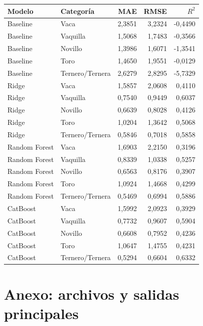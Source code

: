 \documentclass[11pt,a4paper]{article}
\begin{document}
\small
\begin{longtable}{llrrr}
\toprule
\textbf{Modelo} & \textbf{Categoría} & \textbf{MAE} & \textbf{RMSE} & \textbf{$R^2$}\\
\midrule
\endhead
Baseline & Vaca & 2,3851 & 3,2324 & -0,4490\\
Baseline & Vaquilla & 1,5068 & 1,7483 & -0,3566\\
Baseline & Novillo & 1,3986 & 1,6071 & -1,3541\\
Baseline & Toro & 1,4650 & 1,9551 & -0,0129\\
Baseline & Ternero/Ternera & 2,6279 & 2,8295 & -5,7329\\
Ridge & Vaca & 1,5857 & 2,0608 & 0,4110\\
Ridge & Vaquilla & 0,7540 & 0,9449 & 0,6037\\
Ridge & Novillo & 0,6639 & 0,8028 & 0,4126\\
Ridge & Toro & 1,0204 & 1,3642 & 0,5068\\
Ridge & Ternero/Ternera & 0,5846 & 0,7018 & 0,5858\\
Random Forest & Vaca & 1,6903 & 2,2150 & 0,3196\\
Random Forest & Vaquilla & 0,8339 & 1,0338 & 0,5257\\
Random Forest & Novillo & 0,6563 & 0,8176 & 0,3907\\
Random Forest & Toro & 1,0924 & 1,4668 & 0,4299\\
Random Forest & Ternero/Ternera & 0,5469 & 0,6994 & 0,5886\\
CatBoost & Vaca & 1,5992 & 2,0923 & 0,3929\\
CatBoost & Vaquilla & 0,7732 & 0,9607 & 0,5904\\
CatBoost & Novillo & 0,6608 & 0,7952 & 0,4236\\
CatBoost & Toro & 1,0647 & 1,4755 & 0,4231\\
CatBoost & Ternero/Ternera & 0,5294 & 0,6604 & 0,6332\\
\bottomrule
\end{longtable}
\normalsize

\section{Anexo: archivos y salidas principales}
\end{document}
